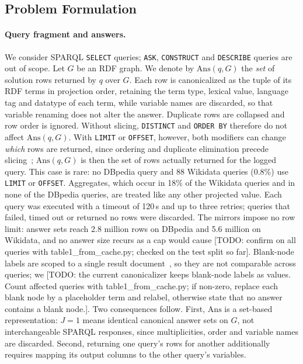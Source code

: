 \documentclass[runningheads]{llncs}
\newcommand{\Ans}{\mathrm{Ans}}
\newcommand{\hp}[1]{{\color{red!75!black}#1}}
\begin{document}
\subsection{Problem Formulation}
\label{sec:problem}

\paragraph{Query fragment and answers.}
We consider SPARQL \texttt{SELECT} queries; \texttt{ASK}, \texttt{CONSTRUCT}
and \texttt{DESCRIBE} queries are out of scope. Let $G$ be an RDF graph. We
denote by $\Ans(q,G)$ the \emph{set} of solution rows returned by $q$ over
$G$. Each row is canonicalized as the tuple of its RDF terms in projection
order, retaining the term type, lexical value, language tag and datatype of
each term, while variable names are discarded, so that variable renaming does
not alter the answer. Duplicate rows are collapsed and row order is ignored.
Without slicing, \texttt{DISTINCT} and \texttt{ORDER BY} therefore do not
affect $\Ans(q,G)$. With \texttt{LIMIT} or \texttt{OFFSET}, however, both
modifiers can change \emph{which} rows are returned, since ordering and
duplicate elimination precede slicing~\cite{w3c2013sparql11}; $\Ans(q,G)$ is
then the set of rows actually returned for the logged query. This case is
rare: no DBpedia query and 88 Wikidata queries (0.8\%) use \texttt{LIMIT} or
\texttt{OFFSET}. Aggregates, which occur in 18\% of the Wikidata queries and in
none of the DBpedia queries, are treated like any other projected value.
Each query was executed with a timeout of 120\,s and up to three retries;
queries that failed, timed out or returned no rows were discarded.
The mirrors impose no row limit: answer sets reach 2.8 million rows on
DBpedia and 5.6 million on Wikidata, and no answer size recurs as a cap
would cause \hp{[TODO: confirm on all queries with table1\_from\_cache.py;
checked on the test split so far]}. Blank-node labels are
scoped to a single result document~\cite{w3c2013sparqljson}, so they are not
comparable across queries; we \hp{[TODO: the current canonicalizer keeps
blank-node labels as values. Count affected queries with
table1\_from\_cache.py; if non-zero, replace each blank node by a placeholder
term and relabel, otherwise state that no answer contains a blank node.]}.
Two consequences follow. First, $\Ans$ is a set-based representation:
$J = 1$ means identical canonical answer sets on $G$, not interchangeable
SPARQL responses, since multiplicities, order and variable names are
discarded. Second, returning one query's rows for another additionally
requires mapping its output columns to the other query's variables.
\end{document}
